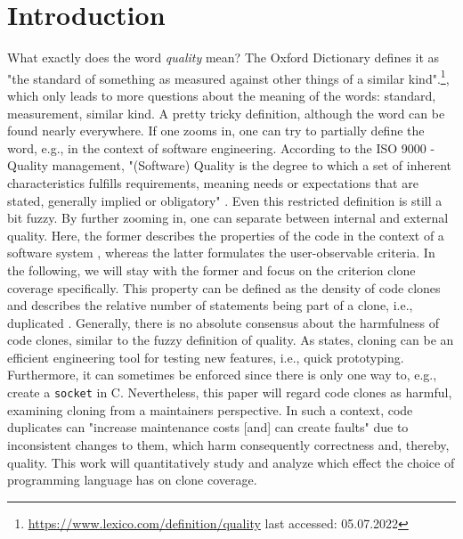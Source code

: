 
\section{Introduction}
\label{sec:intro}

What exactly does the word \textit{quality} mean? The Oxford Dictionary defines it as "the standard of something as measured against other things of a similar kind".\footnote{\url{https://www.lexico.com/definition/quality} last accessed: 05.07.2022}, which only leads to more questions about the meaning of the words: standard, measurement, similar kind. A pretty tricky definition, although the word can be found nearly everywhere.
If one zooms in, one can try to partially define the word, e.g., in the context of software engineering. According to the ISO 9000 - Quality management, "(Software) Quality is the degree to which a set of inherent characteristics fulfills requirements, meaning needs or expectations that are stated, generally implied or obligatory" \cite{matthes2020ase}.
Even this restricted definition is still a bit fuzzy. By further zooming in, one can separate between internal and external quality. Here, the former describes the properties of the code in the context of a software system \cite{pretschner2022requirements}, whereas the latter formulates the user-observable criteria.
In the following, we will stay with the former and focus on the criterion clone coverage specifically.
This property can be defined as the density of code clones and describes the relative number of statements being part of a clone, i.e., duplicated \cite{knilling2020priorisierung}.
Generally, there is no absolute consensus about the harmfulness of code clones, similar to the fuzzy definition of quality. As \cite{kasper2006cloning} states, cloning can be an efficient engineering tool for testing new features, i.e., quick prototyping. Furthermore, it can sometimes be enforced since there is only one way to, e.g., create a \texttt{socket} in C.
Nevertheless, this paper will regard code clones as harmful, examining cloning from a maintainers perspective. In such a context, code duplicates can "increase maintenance costs [and] can create faults" \cite{juergens2009code} due to inconsistent changes to them, which harm consequently correctness and, thereby, quality.
This work will quantitatively study and analyze which effect the choice of programming language has on clone coverage.